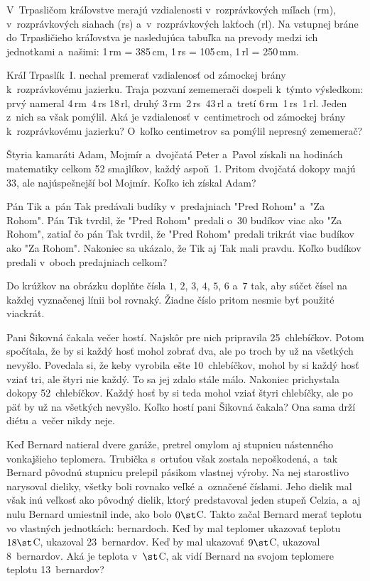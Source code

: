 {%
V~Trpasličom kráľovstve merajú vzdialenosti v~rozprávkových míľach (rm),
v~rozprávkových siahach (rs) a~v~rozprávkových lakťoch (rl).
Na vstupnej bráne do Trpasličieho kráľovstva je nasledujúca tabuľka na
prevody medzi ich jednotkami a~našimi:
  \itemitem{$\bullet$}  1\,rm = 385\,cm,
  \itemitem{$\bullet$}  1\,rs = 105\,cm,
  \itemitem{$\bullet$}  1\,rl = 250\,mm.

Kráľ Trpaslík~I. nechal premerať vzdialenosť od zámockej brány k~rozprávkovému
jazierku. Traja pozvaní zememerači dospeli k~týmto výsledkom:
prvý nameral 4\,rm~4\,rs 18\,rl,
druhý 3\,rm~2\,rs~43\,rl a~tretí 6\,rm~1\,rs~1\,rl.
Jeden z~nich sa však pomýlil.
Aká je vzdialenosť v~centimetroch od zámockej brány k~rozprávkovému jazierku?
O~koľko centimetrov sa pomýlil nepresný zememerač?}

{%
Štyria kamaráti Adam, Mojmír a~dvojčatá Peter a~Pavol získali na hodinách
matematiky celkom 52 smajlíkov, každý aspoň~1.
Pritom dvojčatá dokopy majú 33, ale najúspešnejší bol Mojmír.
Koľko ich získal Adam?}

{%
Pán Tik a~pán Tak predávali budíky v~predajniach "Pred Rohom" a~"Za
Rohom". Pán Tik tvrdil, že "Pred Rohom" predali o~30 budíkov viac ako
"Za Rohom", zatiaľ čo pán Tak tvrdil, že "Pred Rohom" predali trikrát
viac budíkov ako "Za Rohom".
Nakoniec sa ukázalo, že Tik aj Tak mali pravdu.
Koľko budíkov predali v~oboch predajniach celkom?}

{%
Do krúžkov na obrázku doplňte čísla $1$, $2$, $3$, $4$, $5$, $6$ a~$7$ tak, aby
súčet čísel na každej vyznačenej línii bol rovnaký.
Žiadne číslo pritom nesmie byť použité viackrát.
%
}

{%
Pani Šikovná čakala večer hostí. Najskôr pre nich pripravila 25~chlebíčkov. Potom
spočítala, že by si každý hosť mohol zobrať dva, ale po troch by už na všetkých
nevyšlo. Povedala si, že keby vyrobila ešte 10~chlebíčkov, mohol by si každý
hosť vziať tri, ale štyri nie každý. To sa jej zdalo stále málo. Nakoniec
prichystala dokopy 52~chlebíčkov. Každý hosť by si teda mohol vziať štyri
chlebíčky, ale po päť by už na všetkých nevyšlo. Koľko hostí pani Šikovná
čakala? Ona sama drží diétu a~večer nikdy neje.}

{%
Keď Bernard natieral dvere garáže, pretrel omylom aj stupnicu nástenného
vonkajšieho teplomera. Trubička s~ortuťou však zostala nepoškodená, a~tak
Bernard pôvodnú stupnicu prelepil pásikom vlastnej výroby. Na nej starostlivo
narysoval dieliky, všetky boli rovnako veľké a~označené číslami. Jeho dielik mal
však inú veľkosť ako pôvodný dielik, ktorý predstavoval jeden stupeň
Celzia, a~aj nulu Bernard
umiestnil inde, ako bolo $0\st$C. Takto začal Bernard merať teplotu vo
vlastných jednotkách: bernardoch. Keď by mal teplomer ukazovať teplotu
$18\st$C, ukazoval 23~bernardov. Keď by mal ukazovať $9\st$C, ukazoval 8~bernardov.
Aká je teplota v~$\st$C, ak vidí Bernard na svojom teplomere teplotu 13~bernardov?}

